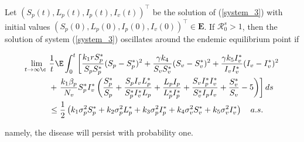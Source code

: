 \begin{theorem}\label{theorem_3}
	Let $(S_p(t),L_p(t),I_p(t),I_v(t))^{\top}$ be the solution of (\ref{system_3}) with initial values $(S_p(0),L_p(0),I_p(0),I_v(0))^{\top}\in \mathbf{E}$. If $\mathcal{R}^s_0>1$, then the solution of system (\ref{system_3}) oscillates around the endemic equilibrium point if
	
	\begin{align*}	
		\lim\limits_{t\rightarrow \infty¸}&\frac{1}{t}\E \int_{0}^{t} \left[\frac{k_1rS_p^*}{S_pS_p^*}(S_p-S_p^*)^2+\frac{\gamma k_4}{S_vS_v^*}(S_v-S_v^*)^2+\frac{\gamma k_5 I_v^*}{I_vI_v^*}(I_v-I_v^*)^2\right.\\
		&+
		\left.\frac{k_1\beta_p}{N_v}S_p^*I_v^*\left(\frac{S_p^*}{S_p}+\frac{S_pI_vL_p^*}{S_p^*I_v^*L_p}+\frac{L_pI_p}{L_p^*I_p^*}+\frac{S_vI_p^*I_v^*}{S_v^*I_pI_v}+\frac{S_v^*}{S_v}-5\right)\right]ds\\
		&\leq
		\frac{1}{2}\left(k_1\sigma_p^2S_p^*+k_2\sigma_p^2 L_p^*+k_3\sigma_p^2I_p^*+k_4\sigma_v^2S_v^*+k_5\sigma_v^2I_v^*\right) \quad a.s.
	\end{align*}
	
	namely, the disease will persist with probability one.
\end{theorem}
